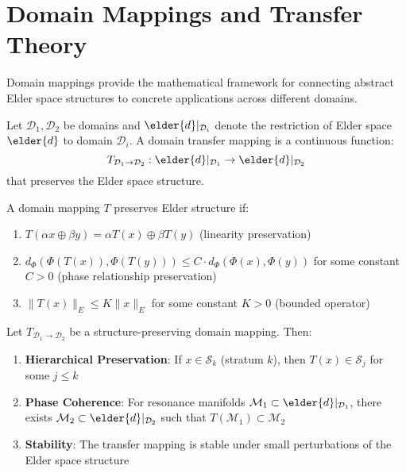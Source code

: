 \section{Domain Mappings and Transfer Theory}

Domain mappings provide the mathematical framework for connecting abstract Elder space structures to concrete applications across different domains.

\begin{definition}
Let $\mathcal{D}_1, \mathcal{D}_2$ be domains and $\elder{d}|_{\mathcal{D}_i}$ denote the restriction of Elder space $\elder{d}$ to domain $\mathcal{D}_i$. A domain transfer mapping is a continuous function:
\begin{equation}
T_{\mathcal{D}_1 \rightarrow \mathcal{D}_2}: \elder{d}|_{\mathcal{D}_1} \rightarrow \elder{d}|_{\mathcal{D}_2}
\end{equation}
that preserves the Elder space structure.
\end{definition}

\begin{definition}
A domain mapping $T$ preserves Elder structure if:
\begin{enumerate}
    \item $T(\alpha x \oplus \beta y) = \alpha T(x) \oplus \beta T(y)$ (linearity preservation)
    \item $d_{\Phi}(\Phi(T(x)), \Phi(T(y))) \leq C \cdot d_{\Phi}(\Phi(x), \Phi(y))$ for some constant $C > 0$ (phase relationship preservation)
    \item $\|T(x)\|_E \leq K \|x\|_E$ for some constant $K > 0$ (bounded operator)
\end{enumerate}
\end{definition}

\begin{theorem}
Let $T_{\mathcal{D}_1 \rightarrow \mathcal{D}_2}$ be a structure-preserving domain mapping. Then:
\begin{enumerate}
    \item \textbf{Hierarchical Preservation}: If $x \in \mathcal{S}_k$ (stratum $k$), then $T(x) \in \mathcal{S}_j$ for some $j \leq k$
    \item \textbf{Phase Coherence}: For resonance manifolds $\mathcal{M}_1 \subset \elder{d}|_{\mathcal{D}_1}$, there exists $\mathcal{M}_2 \subset \elder{d}|_{\mathcal{D}_2}$ such that $T(\mathcal{M}_1) \subset \mathcal{M}_2$
    \item \textbf{Stability}: The transfer mapping is stable under small perturbations of the Elder space structure
\end{enumerate}
\end{theorem}

